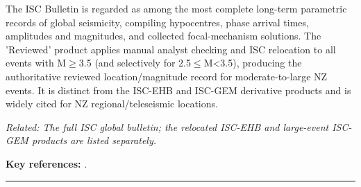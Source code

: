 \documentclass[10pt,a4paper]{article}
\newcommand{\catentryrule}{\par\vspace{3pt}\noindent\textcolor{rulegrey}{\rule{\linewidth}{0.3pt}}\par\vspace{5pt}}
\begin{document}
\par\vspace{2pt}The ISC Bulletin is regarded as among the most complete long-term parametric records of global seismicity, compiling hypocentres, phase arrival times, amplitudes and magnitudes, and collected focal-mechanism solutions. The 'Reviewed' product applies manual analyst checking and ISC relocation to all events with M$\geq$3.5 (and selectively for 2.5$\leq$M\textless{}3.5), producing the authoritative reviewed location/magnitude record for moderate-to-large NZ events. It is distinct from the ISC-EHB and ISC-GEM derivative products and is widely cited for NZ regional/teleseismic locations.
\par{\small\itshape Related: The full ISC global bulletin; the relocated ISC-EHB and large-event ISC-GEM products are listed separately.}
\par\vspace{2pt}\textbf{Key references:} \cite{InternationalSeismologicalCentre2026,Bondr2011,Storchak2017,Storchak2020}.
\catentryrule
\end{document}
